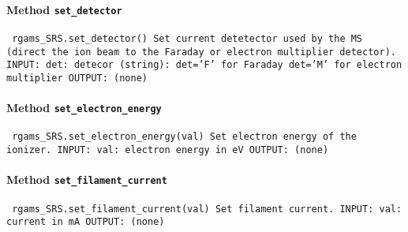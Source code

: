 \paragraph{Method \texttt{set_detector}}
\vspace{1ex}
\texttt{\newline
rgams_SRS.set_detector()\newline
\newline
Set current detetector used by the MS (direct the ion beam to the Faraday or electron multiplier detector).\newline
\newline
INPUT:\newline
det: detecor (string):\newline
det='F' for Faraday\newline
det='M' for electron multiplier\newline
\newline
OUTPUT:\newline
(none)\newline
\newline
}

\paragraph{Method \texttt{set_electron_energy}}
\vspace{1ex}
\texttt{\newline
rgams_SRS.set_electron_energy(val)\newline
\newline
Set electron energy of the ionizer.\newline
\newline
INPUT:\newline
val: electron energy in eV\newline
\newline
OUTPUT:\newline
(none)\newline
\newline
}

\paragraph{Method \texttt{set_filament_current}}
\vspace{1ex}
\texttt{\newline
rgams_SRS.set_filament_current(val)\newline
\newline
Set filament current.\newline
\newline
INPUT:\newline
val: current in mA\newline
\newline
OUTPUT:\newline
(none)\newline
\newline
}

